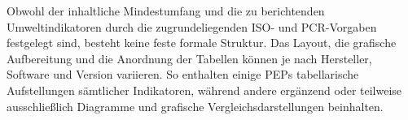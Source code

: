 Obwohl der inhaltliche Mindestumfang und die zu berichtenden Umweltindikatoren durch die zugrundeliegenden ISO- und PCR-Vorgaben festgelegt sind, besteht keine feste formale Struktur. 
Das Layout, die grafische Aufbereitung und die Anordnung der Tabellen können je nach Hersteller, Software und Version variieren. 
So enthalten einige PEPs tabellarische Aufstellungen sämtlicher Indikatoren, während andere ergänzend oder teilweise ausschließlich Diagramme und grafische Vergleichsdarstellungen beinhalten. 
